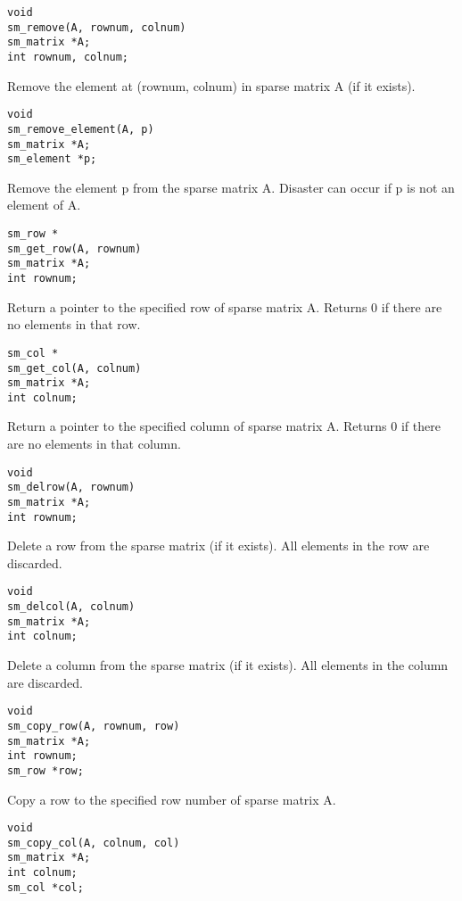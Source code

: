 \begin{verbatim}
void
sm_remove(A, rownum, colnum)
sm_matrix *A;
int rownum, colnum;
\end{verbatim}

        Remove the element at (rownum, colnum) in sparse matrix A (if it exists).


\begin{verbatim}
void
sm_remove_element(A, p)
sm_matrix *A;
sm_element *p;
\end{verbatim}

        Remove the element p from the sparse matrix A.  Disaster can occur if
        p is not an element of A.


\begin{verbatim}
sm_row *
sm_get_row(A, rownum)
sm_matrix *A;
int rownum;
\end{verbatim}

        Return a pointer to the specified row of sparse matrix A.  Returns 0
        if there are no elements in that row.


\begin{verbatim}
sm_col *
sm_get_col(A, colnum)
sm_matrix *A;
int colnum;
\end{verbatim}

        Return a pointer to the specified column of sparse matrix A.  Returns 0
        if there are no elements in that column.


\begin{verbatim}
void
sm_delrow(A, rownum)
sm_matrix *A;
int rownum;
\end{verbatim}

        Delete a row from the sparse matrix (if it exists).  All elements in
        the row are discarded.


\begin{verbatim}
void
sm_delcol(A, colnum)
sm_matrix *A;
int colnum;
\end{verbatim}

        Delete a column from the sparse matrix (if it exists).  All elements
        in the column are discarded.


\begin{verbatim}
void
sm_copy_row(A, rownum, row)
sm_matrix *A;
int rownum;
sm_row *row;
\end{verbatim}

        Copy a row to the specified row number of sparse matrix A.


\begin{verbatim}
void
sm_copy_col(A, colnum, col)
sm_matrix *A;
int colnum;
sm_col *col;
\end{verbatim}

